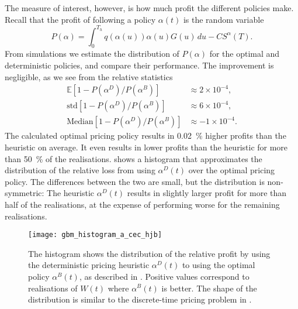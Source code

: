\documentclass[main.tex]{subfiles}
\begin{document}
\begin{example}
  The measure of interest, however, is how much profit the different
  policies make. Recall that the profit of following a policy
  $\alpha(t)$ is the random variable
  \begin{equation}
    P(\alpha)=\int_0^{T_h}q(\alpha(u))\alpha(u)G(u)\,du-CS^\alpha(T).
  \end{equation}
  From simulations we estimate the distribution of $P(\alpha)$ for the
  optimal and deterministic policies, and compare their performance.
  The improvement is negligible, as we see from the relative statistics
  \begin{align}
    \mathbb{E}\left[1-P(\alpha^D)/P(\alpha^B)\right]
    &\approx 2\times 10^{-4},\\
    \mbox{std}\left[1-P(\alpha^D)/P(\alpha^B)\right]
    &\approx 6\times 10^{-4},\\
    \mbox{Median}\left[1-P(\alpha^D)/P(\alpha^B)\right]
    &\approx -1\times 10^{-4}.
  \end{align}
  The calculated optimal pricing policy results in \SI{0.02}{\percent} higher profits
  than the heuristic on average. It even results in lower profits than the
  heuristic for more than \SI{50}{\percent} of the realisations.
   shows a histogram that approximates
  the distribution of the relative loss from using $\alpha^D(t)$
  over the optimal pricing policy. The differences between the two are
  small, but the distribution is non-symmetric:
  The heuristic $\alpha^D(t)$ results in slightly larger profit for more
  than half of
  the realisations, at the expense of performing  worse for the remaining realisations.
  \begin{figure}[htb]
    \centering
    \texttt{[image: gbm\_histogram\_a\_cec\_hjb]}
    \caption[Profit sample distribution comparing the deterministic-case
    pricing heuristic to the Bellman policy]{The histogram shows the distribution of the relative
      profit by using the deterministic pricing heuristic $\alpha^D(t)$
      to using the optimal policy $\alpha^B(t)$, as described in
      . %
      Positive values
      correspond to realisations of $W(t)$ where
      $\alpha^B(t)$ is better.
      The shape of the distribution is similar to the discrete-time pricing problem
      in .
    }\label{fig:gbm_histogram_a_cec_hjb}
  \end{figure}
\end{example}
\end{document}
